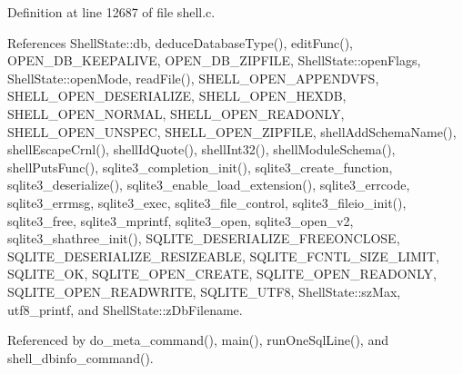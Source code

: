 Definition at line 12687 of file shell.\+c.



References Shell\+State\+::db, deduce\+Database\+Type(), edit\+Func(), O\+P\+E\+N\+\_\+\+D\+B\+\_\+\+K\+E\+E\+P\+A\+L\+I\+VE, O\+P\+E\+N\+\_\+\+D\+B\+\_\+\+Z\+I\+P\+F\+I\+LE, Shell\+State\+::open\+Flags, Shell\+State\+::open\+Mode, read\+File(), S\+H\+E\+L\+L\+\_\+\+O\+P\+E\+N\+\_\+\+A\+P\+P\+E\+N\+D\+V\+FS, S\+H\+E\+L\+L\+\_\+\+O\+P\+E\+N\+\_\+\+D\+E\+S\+E\+R\+I\+A\+L\+I\+ZE, S\+H\+E\+L\+L\+\_\+\+O\+P\+E\+N\+\_\+\+H\+E\+X\+DB, S\+H\+E\+L\+L\+\_\+\+O\+P\+E\+N\+\_\+\+N\+O\+R\+M\+AL, S\+H\+E\+L\+L\+\_\+\+O\+P\+E\+N\+\_\+\+R\+E\+A\+D\+O\+N\+LY, S\+H\+E\+L\+L\+\_\+\+O\+P\+E\+N\+\_\+\+U\+N\+S\+P\+EC, S\+H\+E\+L\+L\+\_\+\+O\+P\+E\+N\+\_\+\+Z\+I\+P\+F\+I\+LE, shell\+Add\+Schema\+Name(), shell\+Escape\+Crnl(), shell\+Id\+Quote(), shell\+Int32(), shell\+Module\+Schema(), shell\+Puts\+Func(), sqlite3\+\_\+completion\+\_\+init(), sqlite3\+\_\+create\+\_\+function, sqlite3\+\_\+deserialize(), sqlite3\+\_\+enable\+\_\+load\+\_\+extension(), sqlite3\+\_\+errcode, sqlite3\+\_\+errmsg, sqlite3\+\_\+exec, sqlite3\+\_\+file\+\_\+control, sqlite3\+\_\+fileio\+\_\+init(), sqlite3\+\_\+free, sqlite3\+\_\+mprintf, sqlite3\+\_\+open, sqlite3\+\_\+open\+\_\+v2, sqlite3\+\_\+shathree\+\_\+init(), S\+Q\+L\+I\+T\+E\+\_\+\+D\+E\+S\+E\+R\+I\+A\+L\+I\+Z\+E\+\_\+\+F\+R\+E\+E\+O\+N\+C\+L\+O\+SE, S\+Q\+L\+I\+T\+E\+\_\+\+D\+E\+S\+E\+R\+I\+A\+L\+I\+Z\+E\+\_\+\+R\+E\+S\+I\+Z\+E\+A\+B\+LE, S\+Q\+L\+I\+T\+E\+\_\+\+F\+C\+N\+T\+L\+\_\+\+S\+I\+Z\+E\+\_\+\+L\+I\+M\+IT, S\+Q\+L\+I\+T\+E\+\_\+\+OK, S\+Q\+L\+I\+T\+E\+\_\+\+O\+P\+E\+N\+\_\+\+C\+R\+E\+A\+TE, S\+Q\+L\+I\+T\+E\+\_\+\+O\+P\+E\+N\+\_\+\+R\+E\+A\+D\+O\+N\+LY, S\+Q\+L\+I\+T\+E\+\_\+\+O\+P\+E\+N\+\_\+\+R\+E\+A\+D\+W\+R\+I\+TE, S\+Q\+L\+I\+T\+E\+\_\+\+U\+T\+F8, Shell\+State\+::sz\+Max, utf8\+\_\+printf, and Shell\+State\+::z\+Db\+Filename.



Referenced by do\+\_\+meta\+\_\+command(), main(), run\+One\+Sql\+Line(), and shell\+\_\+dbinfo\+\_\+command().


